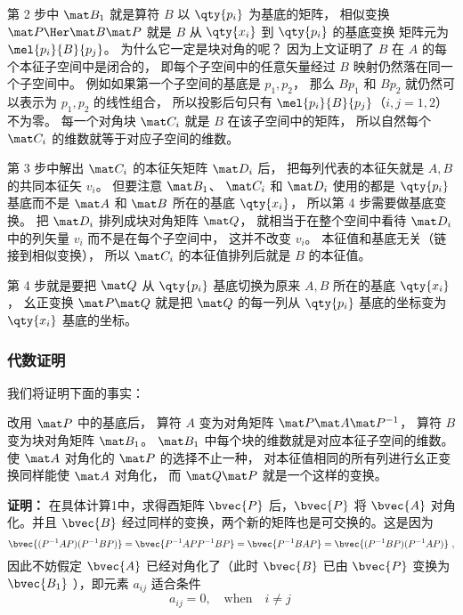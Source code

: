 第 2 步中 $\mat B_1$ 就是算符 $B$ 以 $\qty{p_i}$ 为基底的矩阵， 相似变换 $\mat P\Her \mat B\mat P$ 就是 $B$ 从 $\qty{x_i}$ 到 $\qty{p_i}$ 的基底变换%
矩阵元为 $\mel{p_i}{B}{p_j}$。 为什么它一定是块对角的呢？ 因为上文证明了 $B$ 在 $A$ 的每个本征子空间中是闭合的， 即每个子空间中的任意矢量经过 $B$ 映射仍然落在同一个子空间中。 例如如果第一个子空间的基底是 $p_1, p_2$， 那么 $B p_1$ 和 $B p_2$ 就仍然可以表示为 $p_1, p_2$ 的线性组合， 所以投影后句只有 $\mel{p_i}{B}{p_j}$（$i,j=1,2$）不为零。 每一个对角块 $\mat C_i$ 就是 $B$ 在该子空间中的矩阵， 所以自然每个 $\mat C_i$ 的维数就等于对应子空间的维数。

第 3 步中解出 $\mat C_i$ 的本征矢矩阵 $\mat D_i$ 后， 把每列代表的本征矢就是 $A, B$ 的共同本征矢 $v_i$。 但要注意 $\mat B_1$、 $\mat C_i$ 和 $\mat D_i$ 使用的都是 $\qty{p_i}$ 基底而不是 $\mat A$ 和 $\mat B$ 所在的基底 $\qty{x_i}$， 所以第 4 步需要做基底变换。 把 $\mat D_i$ 排列成块对角矩阵 $\mat Q$， 就相当于在整个空间中看待 $\mat D_i$ 中的列矢量 $v_i$ 而不是在每个子空间中， 这并不改变 $v_i$。 本征值和基底无关（链接到相似变换）， 所以 $\mat C_i$ 的本征值排列后就是 $B$ 的本征值。

第 4 步就是要把 $\mat Q$ 从 $\qty{p_i}$ 基底切换为原来 $A, B$ 所在的基底 $\qty{x_i}$， 幺正变换 $\mat P\mat Q$ 就是把 $\mat Q$ 的每一列从 $\qty{p_i}$ 基底的坐标变为 $\qty{x_i}$ 基底的坐标。%


\subsubsection{代数证明}
我们将证明下面的事实：

改用 $\mat P$ 中的基底后， 算符 $A$ 变为对角矩阵 $\mat P \mat A\mat P^{-1}$， 算符 $B$ 变为块对角矩阵 $\mat B_1$。 $\mat B_1$ 中每个块的维数就是对应本征子空间的维数。 使 $\mat A$ 对角化的 $\mat P$ 的选择不止一种， 对本征值相同的所有列进行幺正变换同样能使 $\mat A$ 对角化， 而 $\mat Q\mat P$ 就是一个这样的变换。

\textbf{证明：}
在具体计算1中，求得酉矩阵 $\bvec{P}$ 后，$\bvec{P}$ 将 $\bvec{A}$ 对角化。并且 $\bvec{B}$ 经过同样的变换，两个新的矩阵也是可交换的。这是因为
\begin{equation}
\bvec{(P^{-1}AP)(P^{-1}BP)}=\bvec{P^{-1}APP^{-1}BP}=\bvec{P^{-1}BAP}=\bvec{(P^{-1}BP)(P^{-1}AP)}~,
\end{equation}
因此不妨假定 $\bvec{A}$ 已经对角化了（此时 $\bvec{B}$ 已由 $\bvec{P}$ 变换为 $\bvec{B_1}$ ），即元素 $a_{ij}$ 适合条件
\begin{equation}
a_{ij}=0,\quad \mathrm{when} \quad i\neq j
\label{eq_Commut_25}~
\end{equation}

